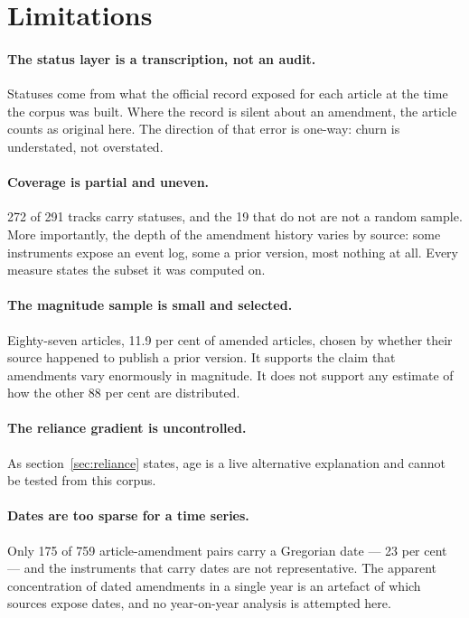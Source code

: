 \documentclass[11pt]{article}
\begin{document}
\section{Limitations}

\paragraph{The status layer is a transcription, not an audit.} Statuses come
from what the official record exposed for each article at the time the corpus
was built. Where the record is silent about an amendment, the article counts
as original here. The direction of that error is one-way: churn is understated,
not overstated.

\paragraph{Coverage is partial and uneven.} 272 of 291 tracks carry statuses,
and the 19 that do not are not a random sample. More importantly, the depth of
the amendment history varies by source: some instruments expose an event log,
some a prior version, most nothing at all. Every measure states the subset it
was computed on.

\paragraph{The magnitude sample is small and selected.} Eighty-seven articles,
11.9 per cent of amended articles, chosen by whether their source happened to
publish a prior version. It supports the claim that amendments vary enormously
in magnitude. It does not support any estimate of how the other 88 per cent are
distributed.

\paragraph{The reliance gradient is uncontrolled.} As section~\ref{sec:reliance}
states, age is a live alternative explanation and cannot be tested from this
corpus.

\paragraph{Dates are too sparse for a time series.} Only 175 of 759
article-amendment pairs carry a Gregorian date --- 23 per cent --- and the instruments that carry
dates are not representative. The apparent concentration of dated amendments in
a single year is an artefact of which sources expose dates, and no
year-on-year analysis is attempted here.
\end{document}
